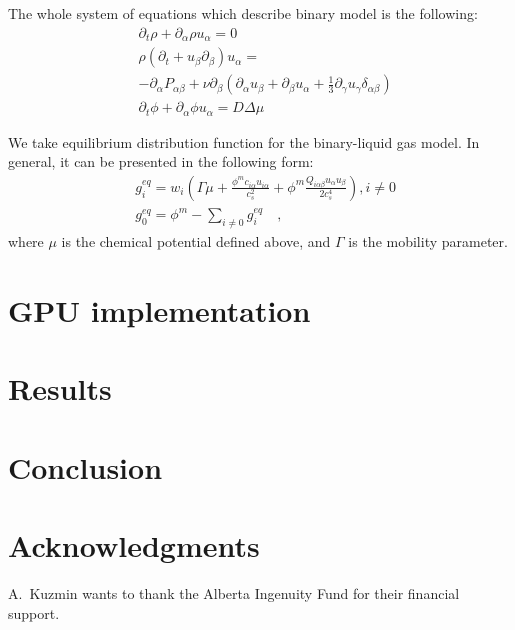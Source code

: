 \documentclass[mathpazo,sort,numbers]{cicp}
\begin{document}
The whole system of equations which describe binary model is the following:
\begin{equation}
\begin{aligned}
&\partial_t \rho+ \partial_{\alpha} \rho u_{\alpha}=0\\
&\rho\left(\partial_t+u_{\beta}\partial_{\beta}\right) u_{\alpha}=\\
&-\partial_{\alpha}P_{\alpha \beta} + \nu\partial_{\beta}\left(\partial_{\alpha}u_{\beta}+\partial_{\beta} u_{\alpha} + \frac{1}{3}\partial_{\gamma} u_{\gamma} \delta_{\alpha\beta}\right)\\
&\partial_t \phi + \partial_{\alpha} \phi u_{\alpha}=D\Delta \mu
\end{aligned}
\label{binary:fluid:system}
\end{equation}

We take equilibrium distribution function for the binary-liquid gas model. In general, it can be presented in the following form:
\begin{equation}
\begin{aligned}
&g_i^{eq}=w_i(\Gamma \mu + \frac{\phi^m c_{i\alpha} u_{i\alpha}}{c_s^2}+\phi^m \frac{Q_{i\alpha\beta}u_{\alpha}u_{\beta}}{2 c_s^4}), i\neq0 \\
&g_0^{eq}=\phi^m-\sum_{i\neq0}{g_i^{eq}}\quad,
\end{aligned}
\end{equation}
where $\mu$ is the chemical potential defined above, and $\Gamma$ is the mobility parameter.

\section{GPU implementation}
\section{Results}
\section{Conclusion}
\section*{Acknowledgments}
A.~Kuzmin wants to thank the Alberta Ingenuity Fund for their financial support.




\end{document}
